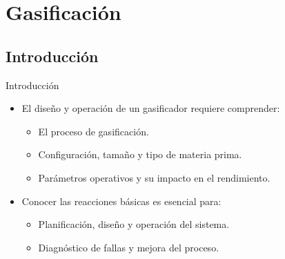 \documentclass[../../main.tex]{subfiles}
\begin{document}
\section{Gasificación}

\subsection{Introducción}
\begin{frame}{Introducción}


\begin{itemize}
  \item El diseño y operación de un gasificador requiere comprender:
  \begin{itemize}
    \item El proceso de gasificación.
    \item Configuración, tamaño y tipo de materia prima.
    \item Parámetros operativos y su impacto en el rendimiento.
  \end{itemize}

  \item Conocer las reacciones básicas es esencial para:
  \begin{itemize}
    \item Planificación, diseño y operación del sistema.
    \item Diagnóstico de fallas y mejora del proceso.
  \end{itemize}
\end{itemize}
\end{frame}
\end{document}
